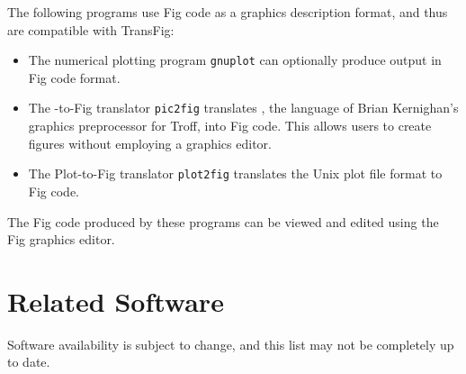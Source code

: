 The following programs use Fig code as a graphics description format,
	and thus are compatible with TransFig:
%
\begin{itemize}

\item The numerical plotting program {\tt gnuplot} can optionally produce 
	output in Fig code format.

\item The \PIC-to-Fig translator {\tt pic2fig} translates \PIC,
	the language of Brian Kernighan's graphics preprocessor for Troff,
	into Fig code.
This allows users to create figures without employing a	graphics editor.

\item The Plot-to-Fig translator {\tt plot2fig} translates the Unix 
	plot file format to Fig code.

\end{itemize}
%
The Fig code produced by these programs can be viewed and edited 
	using the Fig graphics editor.

\vfill
\pagebreak
\section{Related Software}
\label{s:software}

Software availability is subject to change, and this list may not be
	completely up to date.

